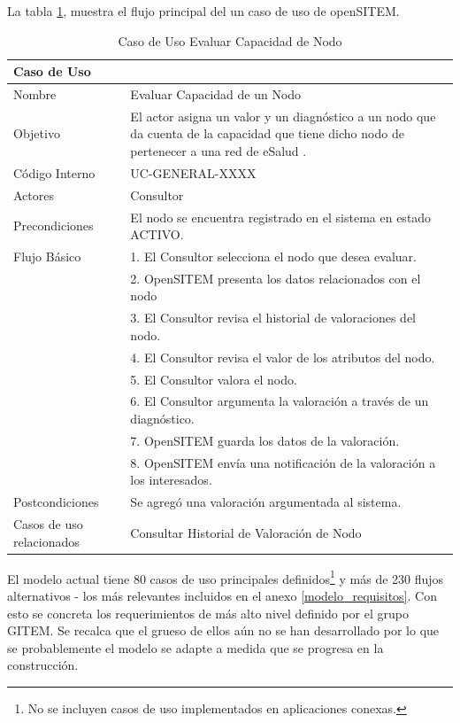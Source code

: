 La tabla \ref{casouso}, muestra el flujo principal del un caso de uso de openSITEM.

\begin{table}
\begin{center}
\begin{tabular}{|l|p{10cm}|}
\hline
\textbf{Caso de Uso}&\\
\hline
Nombre & Evaluar Capacidad de un Nodo\\
\hline
Objetivo & El actor asigna un valor y un diagnóstico a un nodo que da cuenta de la capacidad que tiene dicho nodo de pertenecer a una red de eSalud .\\
\hline
Código Interno & UC-GENERAL-XXXX \\
\hline
Actores & Consultor\\
\hline
Precondiciones & El nodo se encuentra registrado en el sistema en estado ACTIVO.\\
\hline
Flujo Básico & 1. El Consultor selecciona el nodo que desea evaluar.\\
& 2. OpenSITEM presenta los datos relacionados con el nodo\\
& 3. El Consultor revisa el historial de valoraciones del nodo.\\
& 4. El Consultor revisa el valor de los atributos del nodo. \\
& 5. El Consultor valora el nodo.\\
& 6. El Consultor argumenta la valoración a través de un diagnóstico.\\
& 7. OpenSITEM guarda los datos de la valoración.\\
& 8. OpenSITEM envía una notificación de la valoración a los interesados.\\
\hline
Postcondiciones & Se agregó una valoración argumentada al sistema.\\
\hline
Casos de uso relacionados&Consultar Historial de Valoración de Nodo\\
\hline
\end{tabular}
\caption{Caso de Uso Evaluar Capacidad de Nodo}
\label{casouso} 
\end{center}
\end{table}

El modelo actual tiene 80 casos de uso principales definidos\footnote{No se incluyen casos de uso implementados en aplicaciones conexas.} y más de 230 flujos alternativos - los más relevantes incluidos en el anexo \ref{modelo_requisitos}. Con esto se concreta los requerimientos de más alto nivel definido por el grupo GITEM. Se recalca que el grueso de ellos aún no se han desarrollado por lo que se probablemente el modelo se adapte a medida que se progresa en la construcción.


